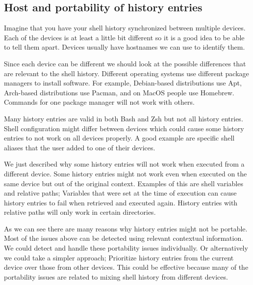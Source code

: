 
\subsection{Host and portability of history entries}

Imagine that you have your shell history synchronized between multiple devices.
Each of the devices is at least a little bit different so it is a good idea to be able to tell them apart. Devices usually have hostnames we can use to identify them. 

Since each device can be different we should look at the possible differences that are relevant to the shell history. Different operating systems use different package managers to install software. For example, Debian-based distributions use Apt, Arch-based distributions use Pacman, and on MacOS people use Homebrew. Commands for one package manager will not work with others.

Many history entries are valid in both Bash and Zsh but not all history entries. Shell configuration might differ between devices which could cause some history entries to not work on all devices properly. A good example are specific shell aliases that the user added to one of their devices.


We just described why some history entries will not work when executed from a different device. Some history entries might not work even when executed on the same device but out of the original context. Examples of this are shell variables and relative paths; Variables that were set at the time of execution can cause history entries to fail when retrieved and executed again. History entries with relative paths will only work in certain directories.

As we can see there are many reasons why history entries might not be portable. Most of the issues above can be detected using relevant contextual information. 
We could detect and handle these portability issues individually. Or alternatively we could take a simpler approach; Prioritize history entries from the current device over those from other devices. This could be effective because many of the portability issues are related to mixing shell history from different devices. 


